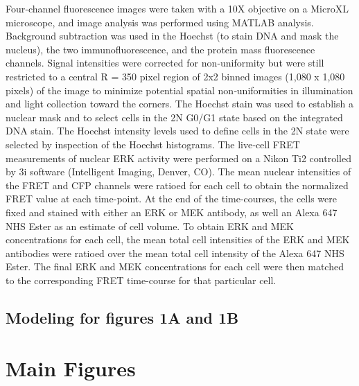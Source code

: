 Four‐channel fluorescence images were taken with a 10X objective on a MicroXL microscope, and image analysis was performed using MATLAB analysis. Background subtraction was used in the Hoechst (to stain DNA and mask the nucleus), the two immunofluorescence, and the protein mass fluorescence channels. Signal intensities were corrected for non‐uniformity but were still restricted to a central R = 350 pixel region of 2x2 binned images (1,080 x 1,080 pixels) of the image to minimize potential spatial non‐uniformities in illumination and light collection toward the corners. The Hoechst stain was used to establish a nuclear mask and to select cells in the 2N G0/G1 state based on the integrated DNA stain. The Hoechst intensity levels used to define cells in the 2N state were selected by inspection of the Hoechst histograms. The live‐cell FRET measurements of nuclear ERK activity were performed on a Nikon Ti2 controlled by 3i software (Intelligent Imaging, Denver, CO). The mean nuclear intensities of the FRET and CFP channels were ratioed for each cell to obtain the normalized FRET value at each time-point. At the end of the time-courses, the cells were fixed and stained with either an ERK or MEK antibody, as well an Alexa 647 NHS Ester as an estimate of cell volume. To obtain ERK and MEK concentrations for each cell, the mean total cell intensities of the ERK and MEK antibodies were ratioed over the mean total cell intensity of the Alexa 647 NHS Ester. The final ERK and MEK concentrations for each cell were then matched to the corresponding FRET time-course for that particular cell.

\subsection{Modeling for figures 1A and 1B}

\section{Main Figures}

